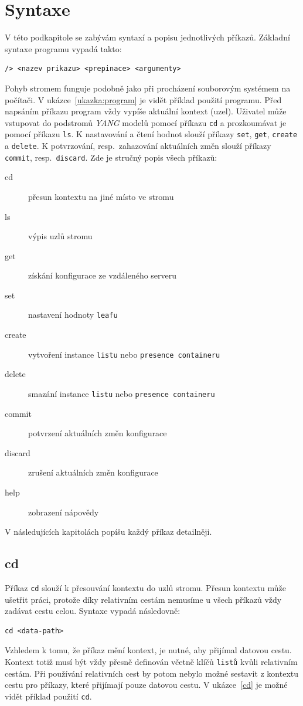 \documentclass[thesis=B,czech,hidelinks]{FITthesis}[2019/03/06]
\begin{document}
\section{Syntaxe}\label{syntaxe}
V této podkapitole se zabývám syntaxí a popisu jednotlivých příkazů. Základní syntaxe programu vypadá takto:
\begin{verbatim}
/> <nazev prikazu> <prepinace> <argumenty>
\end{verbatim}
Pohyb stromem funguje podobně jako při procházení souborovým systémem na počítači. V ukázce~\ref{ukazka:program} je vidět příklad použití programu. Před napsáním příkazu program vždy vypíše aktuální kontext (uzel). Uživatel může vstupovat do podstromů \textit{YANG} modelů pomocí příkazu \texttt{cd} a prozkoumávat je pomocí příkazu \texttt{ls}. K nastavování a čtení hodnot slouží příkazy \texttt{set}, \texttt{get}, \texttt{create} a \texttt{delete}. K potvrzování, resp.\ zahazování aktuálních změn slouží příkazy \texttt{commit}, resp.\ \texttt{discard}. Zde je stručný popis všech příkazů:
\begin{description}
\item[cd]{přesun kontextu na jiné místo ve stromu}
\item[ls]{výpis uzlů stromu}
\item[get]{získání konfigurace ze vzdáleného serveru}
\item[set]{nastavení hodnoty \texttt{leafu}}
\item[create]{vytvoření instance \texttt{listu} nebo \texttt{presence containeru}}
\item[delete]{smazání instance \texttt{listu} nebo \texttt{presence containeru}}
\item[commit]{potvrzení aktuálních změn konfigurace}
\item[discard]{zrušení aktuálních změn konfigurace}
\item[help]{zobrazení nápovědy}
\end{description}

V následujících kapitolách popíšu každý příkaz detailněji.

\subsection{cd}
Příkaz \texttt{cd} slouží k přesouvání kontextu do uzlů stromu. Přesun kontextu může ušetřit práci, protože díky relativním cestám nemusíme u všech příkazů vždy zadávat cestu celou. Syntaxe vypadá následovně:
\begin{verbatim}
cd <data-path>
\end{verbatim}
Vzhledem k tomu, že příkaz mění kontext, je nutné, aby přijímal datovou cestu. Kontext totiž musí být vždy přesně definován včetně klíčů \texttt{listů} kvůli relativním cestám. Při používání relativních cest by potom nebylo možné sestavit z kontextu cestu pro příkazy, které přijímají pouze datovou cestu. V ukázce~\ref{cd} je možné vidět příklad použití \texttt{cd}.
\end{document}
